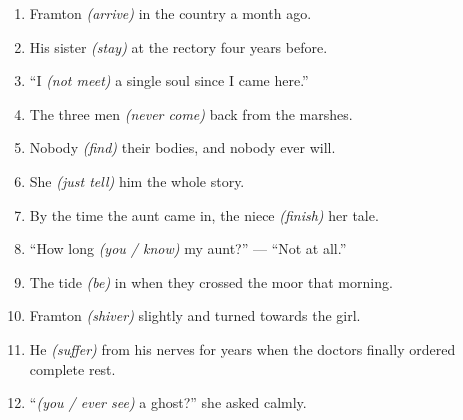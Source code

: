 \documentclass{fiche}
\begin{document}
\entete





\begin{anglais}
\begin{enumerate}[label=\arabic*.,itemsep=2.2mm,leftmargin=*]
  \item Framton \emph{(arrive)}  in the country a month ago.
  \item His sister \emph{(stay)}  at the rectory four years before.
  \item ``I \emph{(not meet)}  a single soul since I came here.''
  \item The three men \emph{(never come)}  back from the marshes.
  \item Nobody \emph{(find)}  their bodies, and nobody ever will.
  \item She \emph{(just tell)}  him the whole story.
  \item By the time the aunt came in, the niece \emph{(finish)}  her tale.
  \item ``How long \emph{(you / know)}  my aunt?'' --- ``Not at all.''
  \item The tide \emph{(be)}  in when they crossed the moor that morning.
  \item Framton \emph{(shiver)}  slightly and turned towards the girl.
  \item He \emph{(suffer)}  from his nerves for years when the
    doctors finally ordered complete rest.
  \item ``\emph{(you / ever see)}  a ghost?'' she asked calmly.
\end{enumerate}
\end{anglais}
\end{document}
